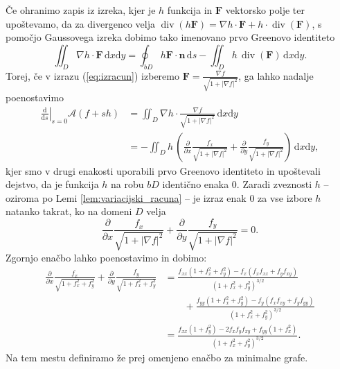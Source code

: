 \documentclass[fin1, tisk, bibtex]{fmfdelo}
\begin{document}
Če ohranimo zapis iz izreka, kjer je $h$ funkcija in $\mathbf{F}$ vektorsko polje ter upoštevamo, da za divergenco velja $\operatorname{div}(h \mathbf{F})=\nabla h \cdot \mathbf{F}+h \cdot \operatorname{div}(\mathbf{F})$, s pomočjo Gaussovega izreka dobimo tako imenovano prvo Greenovo identiteto
\begin{equation*}
    \iint_{D} \nabla h \cdot \mathbf{F} \, \mathrm{d} x \mathrm{d} y=\oint_{b D} h \mathbf{F} \cdot \mathbf{n} \, \mathrm{d} s-\iint_{D} h \, \operatorname{div}(\mathbf{F}) \, \mathrm{d} x \mathrm{d} y.
\end{equation*}
Torej, če v izrazu (\ref{eq:izracun}) izberemo $\mathbf{F}=\frac{\nabla f}{\sqrt{1+|\nabla f|^2}}$, ga lahko nadalje poenostavimo 
\begin{align*}
    \left.\frac{\mathrm{d}}{\mathrm{d} s}\right|_{s=0} \mathcal{A}(f+s h) & =\iint_{D} \nabla h \cdot \frac{\nabla f}{\sqrt{1+|\nabla f|^2}} \, \mathrm{d} x \mathrm{d} y \\
    & =-\iint_{D} h \,\left(\frac{\partial}{\partial x} \frac{f_x}{\sqrt{1+|\nabla f|^2}}+\frac{\partial}{\partial y} \frac{f_y}{\sqrt{1+|\nabla f|^2}}\right) \, \mathrm{d} x \mathrm{d} y,
\end{align*}
kjer smo v drugi enakosti uporabili prvo Greenovo identiteto in upoštevali dejstvo, da je funkcija $h$ na robu $bD$ identično enaka 0. Zaradi zveznosti $h$ -- oziroma po Lemi \ref{lem:variacijski_racuna} -- je izraz enak $0$ za vse izbore $h$ natanko takrat, ko na domeni $D$ velja 
\begin{equation*}
    \frac{\partial}{\partial x} \frac{f_x}{\sqrt{1+|\nabla f|^2}}+\frac{\partial}{\partial y} \frac{f_y}{\sqrt{1+|\nabla f|^2}}=0.
\end{equation*}   
Zgornjo enačbo lahko poenostavimo in dobimo:
\begin{align*}
    \frac{\partial}{\partial x} \frac{f_x}{\sqrt{1+f_x^2+f_y^2}}+\frac{\partial}{\partial y} \frac{f_y}{\sqrt{1+f_x^2+f_y^2}} & =\frac{f_{x x}\left(1+f_x^2+f_y^2\right)-f_x\left(f_x f_{x x}+f_y f_{x y}\right)}{\left(1+f_x^2+f_y^2\right)^{3 / 2}} \\
    & \qquad +\frac{f_{y y}\left(1+f_x^2+f_y^2\right)-f_y\left(f_x f_{x y}+f_y f_{y y}\right)}{\left(1+f_x^2+f_y^2\right)^{3 / 2}} \\
    & =\frac{f_{x x}\left(1+f_y^2\right)-2 f_x f_y f_{x y}+f_{y y}\left(1+f_x^2\right)}{\left(1+f_x^2+f_y^2\right)^{3 / 2}}.
\end{align*}
Na tem mestu definiramo že prej omenjeno enačbo za minimalne grafe.
\end{document}
